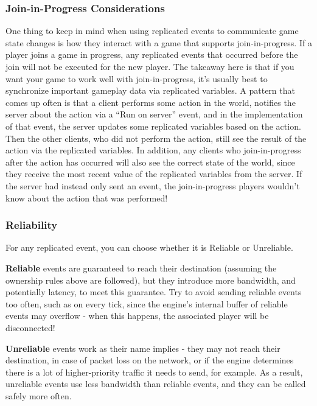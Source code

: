 \documentclass[
  letterpaper,
  DIV=11,
  numbers=noendperiod]{scrartcl}
\begin{document}
\subsubsection{Join-in-Progress
Considerations}\label{join-in-progress-considerations}

One thing to keep in mind when using replicated events to communicate
game state changes is how they interact with a game that supports
join-in-progress. If a player joins a game in progress, any replicated
events that occurred before the join will not be executed for the new
player. The takeaway here is that if you want your game to work well
with join-in-progress, it's usually best to synchronize important
gameplay data via replicated variables. A pattern that comes up often is
that a client performs some action in the world, notifies the server
about the action via a ``Run on server'' event, and in the
implementation of that event, the server updates some replicated
variables based on the action. Then the other clients, who did not
perform the action, still see the result of the action via the
replicated variables. In addition, any clients who join-in-progress
after the action has occurred will also see the correct state of the
world, since they receive the most recent value of the replicated
variables from the server. If the server had instead only sent an event,
the join-in-progress players wouldn't know about the action that was
performed!

\subsubsection{Reliability}\label{reliability}

For any replicated event, you can choose whether it is Reliable or
Unreliable.

\textbf{Reliable} events are guaranteed to reach their destination
(assuming the ownership rules above are followed), but they introduce
more bandwidth, and potentially latency, to meet this guarantee. Try to
avoid sending reliable events too often, such as on every tick, since
the engine's internal buffer of reliable events may overflow - when this
happens, the associated player will be disconnected!

\textbf{Unreliable} events work as their name implies - they may not
reach their destination, in case of packet loss on the network, or if
the engine determines there is a lot of higher-priority traffic it needs
to send, for example. As a result, unreliable events use less bandwidth
than reliable events, and they can be called safely more often.
\end{document}
